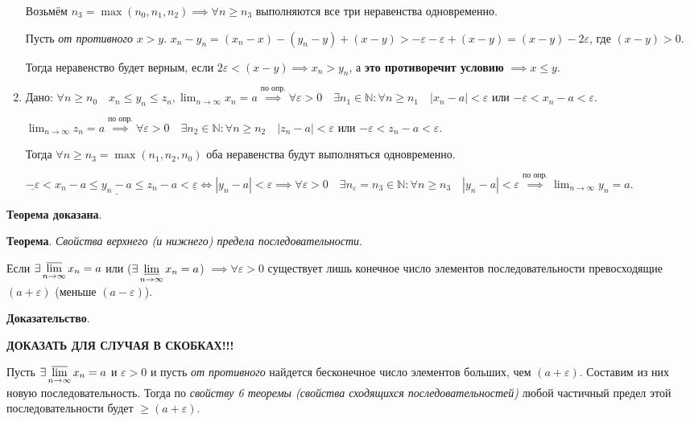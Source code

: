 \documentclass{article}
\newcommand{\bydef}{\stackrel{\text{по опр.}}{\implies}} %
\newcommand{\parspace}{\vspace{10pt}}
\newcommand{\dslim}{\displaystyle\lim}
\newcommand{\dslimn}{\dslim_{n \to \infty}}
\theoremstyle{break}
\begin{document}
\begin{enumerate}
    Возьмём $n_3 = \max (n_0, n_1, n_2) \implies \forall n \ge n_3$ выполняются
    все три неравенства одновременно.

    Пусть \textit{от противного} $x > y$. 
    $x_n - y_n = (x_n - x) - (y_n - y) + (x - y) > 
    -\varepsilon - \varepsilon + (x - y) = (x - y) - 2 \varepsilon$, где $(x - y) > 0$.

    Тогда неравенство будет верным, если $2 \varepsilon < (x - y) \implies x_n > y_n$,
    а \textbf{это противоречит условию} $\implies x \le y$.

    \item Дано: $\forall n \ge n_0 \quad x_n \le y_n \le z_n, 
    \dslimn x_n = a \bydef
    \forall \varepsilon > 0 \quad \exists n_1 \in \mathbb{N}:
    \forall n \ge n_1 \quad |x_n - a| < \varepsilon$ или
    $-\varepsilon < x_n - a < \varepsilon$.
    
    $\dslimn z_n = a \bydef
    \forall \varepsilon > 0 \quad \exists n_2 \in \mathbb{N}:
    \forall n \ge n_2 \quad |z_n - a| < \varepsilon$ или
    $-\varepsilon < z_n - a < \varepsilon$.

    Тогда $\forall n \ge n_3 = \max (n_1, n_2, n_0)$ оба неравенства
    будут выполняться одновременно.

    $\underline{-\varepsilon} < x_n - a \le \underline{y_n - a} \le
    z_n - a < \underline{\varepsilon} \Leftrightarrow |y_n - a| < \varepsilon
    \implies \forall \varepsilon > 0 \quad \exists n_\varepsilon = n_3 \in \mathbb{N}:
    \forall n \ge n_3 \quad |y_n - a| < \varepsilon \bydef 
    \dslimn y_n = a$.
\end{enumerate}

\textbf{Теорема доказана}.

\parspace

\textbf{Теорема}. \textit{Свойства верхнего (и нижнего) предела последовательности}.

Если $\exists \displaystyle\varlimsup_{n \to \infty} x_n = a$ 
или ($\exists \displaystyle\varliminf_{n \to \infty} x_n = a$)
$\implies \forall \varepsilon > 0$ существует лишь конечное число элементов
последовательности превосходящие $(a + \varepsilon)$ (меньше $(a - \varepsilon)$).

\textbf{Доказательство}.

\textbf{ДОКАЗАТЬ ДЛЯ СЛУЧАЯ В СКОБКАХ!!!}

Пусть $\exists \displaystyle\varlimsup_{n \to \infty} x_n = a$ и $\varepsilon > 0$ и
пусть \textit{от противного} найдется бесконечное число элементов больших, чем
$(a + \varepsilon)$. Составим из них новую последовательность. Тогда по 
\textit{свойству 6 теоремы (свойства сходящихся последовательностей)} любой
частичный предел этой последовательности будет $\ge (a + \varepsilon)$.
\end{document}
